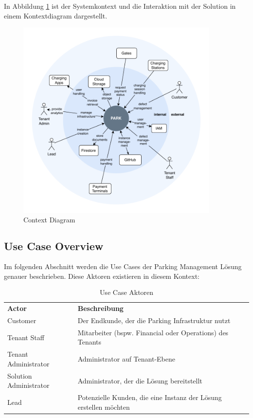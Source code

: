 In Abbildung \ref{fig:context-diagram} ist der Systemkontext und die Interaktion mit der Solution in einem Kontextdiagram dargestellt.

\begin{figure}[ht]
    \centering
    \includegraphics[width=0.9\textwidth]{resources/context-diagram.pdf}
    \caption{Context Diagram}
    \label{fig:context-diagram}
\end{figure}


\subsection{Use Case Overview}
Im folgenden Abschnitt werden die Use Cases der Parking Management Lösung genauer beschrieben. Diese Aktoren existieren in diesem Kontext:

\renewcommand{\arraystretch}{1.5}
{
\begin{longtable}{l p{10cm}}
    \caption{Use Case Aktoren}
    \label{tab:use-case-actors} \\
    \textbf{Actor} & \textbf{Beschreibung} \\ [1ex]
    Customer & Der Endkunde, der die Parking Infrastruktur nutzt \\ [0.5ex]
    Tenant Staff & Mitarbeiter (bspw. Financial oder Operations) des Tenants \\ [0.5ex]
    Tenant Administrator & Administrator auf Tenant-Ebene \\ [0.5ex]
    Solution Administrator & Administrator, der die Lösung bereitstellt \\ [0.5ex]
    Lead & Potenzielle Kunden, die eine Instanz der Lösung erstellen möchten \\ 
\end{longtable}}

